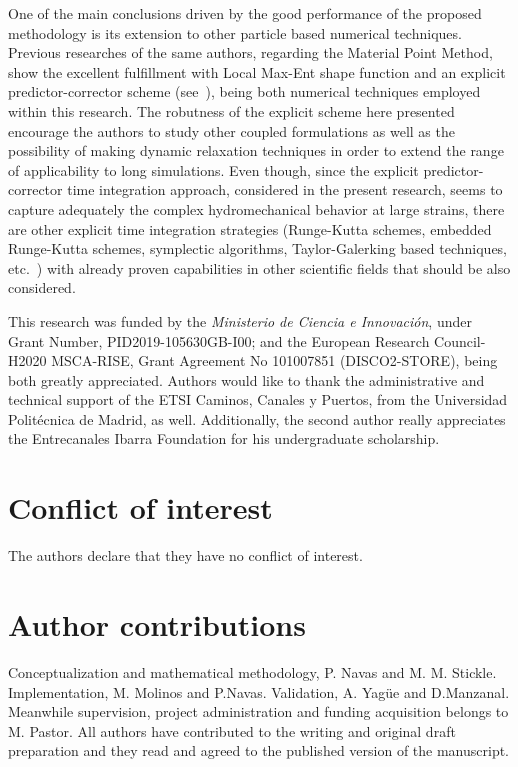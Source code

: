 \documentclass[twocolumn]{svjour3}          %
\begin{document}
One of the main conclusions driven by the good performance of the proposed methodology is its extension to other particle based numerical techniques. Previous researches of the same authors, regarding the Material Point Method, show the excellent fulfillment with Local Max-Ent shape function and an explicit predictor-corrector scheme (see~\cite{Molinos2021,Molinos2021b}), being both numerical techniques employed within this research. The robutness of the explicit scheme here presented encourage the authors to study other coupled formulations as well as the possibility of making dynamic relaxation techniques in order to extend the range of applicability to long simulations. Even though, since the explicit predictor-corrector time integration approach, considered in the present research, seems to capture adequately the complex hydromechanical behavior at large strains, there are other explicit time integration strategies (Runge-Kutta schemes, embedded Runge-Kutta schemes, symplectic algorithms, Taylor-Galerking based techniques, etc.~\cite{ODE1, BlancPastor2012, Torabi2020}) with already proven capabilities in other scientific fields that should be also considered.

\begin{acknowledgements}
This research was funded by the \textit{Ministerio de Ciencia e Innovaci\'on}, under Grant Number, PID2019-105630GB-I00; and the European
Research Council-H2020 MSCA-RISE, Grant Agreement No 101007851 (DISCO2-STORE), being both greatly appreciated. Authors would like to thank the administrative and technical support of the ETSI Caminos, Canales y Puertos, from the Universidad Polit\'ecnica de Madrid, as well. Additionally, the second author really appreciates the Entrecanales Ibarra Foundation for his undergraduate scholarship.
\end{acknowledgements}


%
\section*{Conflict of interest}
The authors declare that they have no conflict of interest.

\section*{Author contributions}
Conceptualization and mathematical methodology, P. Navas and M. M. Stickle. Implementation, M. Molinos and P.Navas. Validation, A. Yag\"ue and D.Manzanal. Meanwhile supervision, project administration and funding acquisition belongs to M. Pastor. All authors have contributed to the writing and original draft preparation and they read and agreed to the published version of the manuscript.
\end{document}

